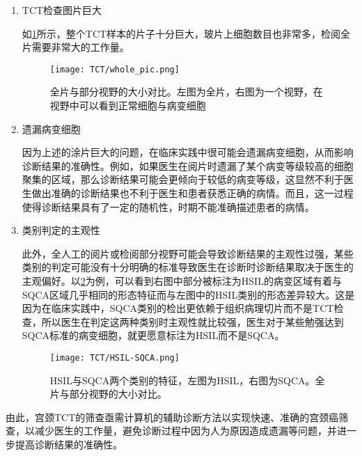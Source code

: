 \begin{enumerate}
    \item TCT检查图片巨大
          \par 如\ref{全片}所示，整个TCT样本的片子十分巨大，玻片上细胞数目也非常多，检阅全片需要非常大的工作量。

          \begin{figure}[h]
              \centering
              \texttt{[image: TCT/whole\_pic.png]}
              \caption{全片与部分视野的大小对比。左图为全片，右图为一个视野，在视野中可以看到正常细胞与病变细胞}
              \label{全片}
          \end{figure}
    \item 遗漏病变细胞
          \par 因为上述的涂片巨大的问题，在临床实践中很可能会遗漏病变细胞，从而影响诊断结果的准确性。例如，如果医生在阅片时遗漏了某个病变等级较高的细胞聚集的区域，那么诊断结果可能会更倾向于较低的病变等级，这显然不利于医生做出准确的诊断结果也不利于医生和患者获悉正确的病情。而且，这一过程使得诊断结果具有了一定的随机性，时期不能准确描述患者的病情。
    \item 类别判定的主观性
          \par 此外，全人工的阅片或检阅部分视野可能会导致诊断结果的主观性过强，某些类别的判定可能没有十分明确的标准导致医生在诊断时诊断结果取决于医生的主观偏好。以\ref{HSIL-SQCA}为例，可以看到右图中部分被标注为HSIL的病变区域有着与SQCA区域几乎相同的形态特征而与左图中的HSIL类别的形态差异较大。这是因为在临床实践中，SQCA类别的检出更依赖于组织病理切片而不是TCT检查，所以医生在判定这两种类别时主观性就比较强，医生对于某些勉强达到SQCA标准的病变细胞，就更愿意标注为HSIL而不是SQCA。

          \begin{figure}[h]
              \centering
              \texttt{[image: TCT/HSIL-SQCA.png]}
              \caption{HSIL与SQCA两个类别的特征，左图为HSIL，右图为SQCA。全片与部分视野的大小对比。}
              \label{HSIL-SQCA}
          \end{figure}
\end{enumerate}
\par 由此，宫颈TCT的筛查亟需计算机的辅助诊断方法以实现快速、准确的宫颈癌筛查，以减少医生的工作量，避免诊断过程中因为人为原因造成遗漏等问题，并进一步提高诊断结果的准确性。

